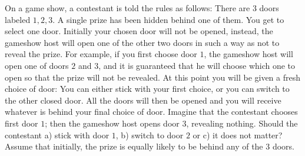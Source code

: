 \begin{example}
	On a game show, a contestant is told the rules as follows: There are $3$ doors labeled $1,2,3$. A single prize has been hidden behind one of them. You get to select one door. Initially your chosen door will not be opened, instead, the gameshow host will open one of the other two doors in such a way as not to reveal the prize. For example, if you first choose door $1$, the gameshow host will open one of doors $2$ and $3$, and it is guaranteed that he will choose which one to open so that the prize will not be revealed. At this point you will be given a fresh choice of door: You can either stick with your first choice, or you can switch to the other closed door. All the doors will then be opened and you will receive whatever is behind your final choice of door.\newline
	Imagine that the contestant chooses first door $1$; then the gameshow host opens door $3$, revealing nothing. Should the contestant a) stick with door $1$, b) switch to door $2$ or c) it does not matter? Assume that initially, the prize is equally likely to be behind any of the $3$ doors. \newline
	

\end{example}
